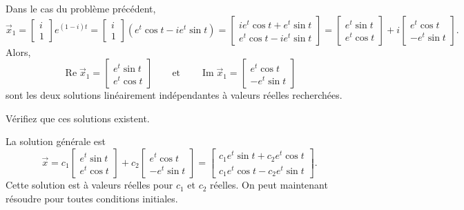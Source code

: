 Dans le cas du problème précédent,
\begin{equation*}
\vec{x}_1 =
\begin{bmatrix} i \\ 1 \end{bmatrix} e^{(1-i)t}
=
\begin{bmatrix} i \\ 1 \end{bmatrix} \left( e^t \cos t - i e^t \sin t \right)
=
\begin{bmatrix}
i e^t \cos t + e^t \sin t \\
e^t \cos t - i e^t \sin t
\end{bmatrix}
=
\begin{bmatrix}
e^t \sin t \\
e^t \cos t
\end{bmatrix}
+ i
\begin{bmatrix}
e^t \cos t \\
- e^t \sin t
\end{bmatrix}
.
\end{equation*}
Alors, 
\begin{equation*}
\operatorname{Re} \vec{x}_1 = 
\begin{bmatrix}
e^t \sin t \\
e^t \cos t
\end{bmatrix} 
\qquad \text{et} \qquad
\operatorname{Im} \vec{x}_1 = 
\begin{bmatrix}
e^t \cos t \\
- e^t \sin t
\end{bmatrix} 
\end{equation*}
sont les deux solutions linéairement indépendantes à valeurs réelles recherchées.

\begin{exercise}
Vérifiez que ces solutions existent.
\end{exercise}

La solution générale est
\begin{equation*}
\vec{x}
=
c_1
\begin{bmatrix}
e^t \sin t \\
e^t \cos t
\end{bmatrix} 
+ c_2
\begin{bmatrix}
e^t \cos t \\
-e^t \sin t
\end{bmatrix} 
=
\begin{bmatrix}
c_1 e^t \sin t + c_2 e^t \cos t \\
c_1 e^t \cos t - c_2 e^t \sin t
\end{bmatrix} .
\end{equation*}
Cette solution est à valeurs réelles pour $c_1$ et $c_2$ réelles. On peut maintenant résoudre pour toutes conditions initiales.

